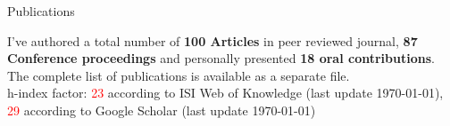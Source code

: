\begin{cvblock}{Publications}
\end{cvblock}
I've authored a total number of \textbf{100 Articles} in peer reviewed journal,
\textbf{87 Conference proceedings} and personally presented \textbf{18 oral
contributions}. The complete list of publications is available as a
separate file. \\
h-index factor: \textcolor{red}{23} according to ISI Web of Knowledge
(last update \today), \textcolor{red}{29} according to Google Scholar (last update \today)

